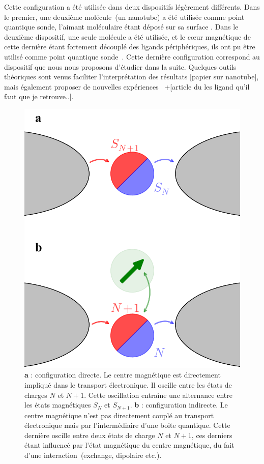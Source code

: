 Cette configuration a été utilisée dans deux dispositifs légèrement différents. Dans le premier, une deuxième molécule~(un nanotube) a été utilisée comme point quantique sonde, l'aimant moléculaire étant déposé sur sa surface \cite{Urdampilleta2011}. Dans le deuxième dispositif, une seule molécule a été utilisée, et le cœur magnétique de cette dernière étant fortement découplé des ligands périphériques, ils ont pu être utilisé comme point quantique sonde~\cite{Vincent2012}. Cette dernière configuration correspond au dispositif que nous nous proposons d'étudier dans la suite. Quelques outils théoriques sont venus faciliter l'interprétation des résultats [papier sur nanotube], mais également proposer de nouvelles expériences~\cite{Jaafar2010} +[article du les ligand qu'il faut que je retrouve..].


\begin{figure}
\parbox{6.5cm}{
\centering \includegraphics[scale=0.45]{Resultats/DirVsInd/DirVsInd.pdf} 
}
\parbox{7.5cm}{
\caption{\textbf{a} : configuration directe. Le centre magnétique est directement impliqué dans le transport électronique. Il oscille entre les états de charges $N$ et $N+1$. Cette oscillation entraîne une alternance entre les états magnétiques $S_{N}$ et $S_{N+1}$. \textbf{b} : configuration indirecte. Le centre magnétique n'est pas directement couplé au transport électronique mais par l'intermédiaire d'une boite quantique. Cette dernière oscille entre deux états de charge $N$ et $N+1$, ces derniers étant influencé par l'état magnétique du centre magnétique, du fait d'une interaction~(exchange, dipolaire etc.).}
\label{DirVsInd}
}
\end{figure}


